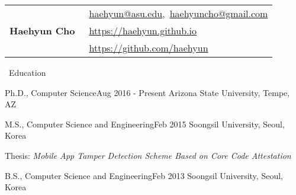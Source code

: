 \documentclass{resume} %
\providecommand*\email[1]{\href{mailto:#1}{#1}}
\begin{document}
\begin{table}[t]
\begin{tabular}{ll}
	\multirow{3}{*}{ \Huge\textbf{Haehyun Cho} } 
	& \hspace{1.7cm}\faEnvelopeSquare~\email{haehyun@asu.edu},~\email{haehyuncho@gmail.com}\\
	& \hspace{1.7cm}\faExternalLink~\href{https://haehyun.github.io}{https://haehyun.github.io} \\
	& \hspace{1.7cm}\faGithub~\href{https://github.com/haehyun}{https://github.com/haehyun}\\
\end{tabular}
\end{table}

\vspace{-10mm}

\begin{rSection}{\faGenderless~Education}

	\begin{rSubsection2}
		{Ph.D., Computer Science}{Aug 2016 - Present}
		{Arizona State University, Tempe, AZ}{}
	\end{rSubsection2}
	\vspace{-3mm}
	\begin{rSubsection}
		{M.S., Computer Science and Engineering}{Feb 2015}
		{Soongsil University, Seoul, Korea}{}
		\item Thesis: \emph{Mobile App Tamper Detection Scheme Based on Core Code Attestation}
		
	\end{rSubsection}
	\vspace{-3mm}
	\begin{rSubsection2}
		{B.S., Computer Science and Engineering}{Feb 2013}
		{Soongsil University, Seoul, Korea}{}
	\end{rSubsection2}

\end{rSection}
\end{document}
